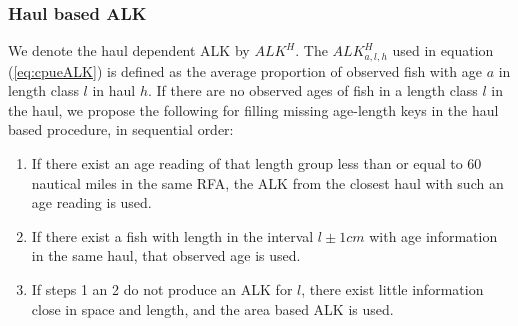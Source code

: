 \documentclass[a4paper 12pt]{article}
\numberwithin{equation}{section}
\newcommand{\ed}[1]{\textcolor{red}{#1}}
\newcommand{\olav}[1]{\textcolor{darkgreen}{#1}}
\begin{document}
\subsubsection{Haul based ALK}
\label{sec:haulestimator}
We denote the haul dependent ALK  by  $ALK^{H}$. The $ALK^{H}_{a,l,h}$  used in equation (\ref{eq:cpueALK}) is defined as the average proportion of observed fish with age $a$ in  length class $l$ in haul $h$. If there are no observed ages of fish in a length class $l$ in the haul, we propose the following for filling missing age-length keys in the  haul based procedure, in sequential order:
\begin{enumerate}
\item If there exist an age reading of that length group less than or equal to 60 nautical miles in the same RFA, the ALK from the closest haul with such an age reading is used.
\item If there exist a fish with length in the interval $l\pm 1cm$ with age information in the same haul, that observed age is used.  
\item If steps 1 an 2 do not produce an ALK for $l$, there exist little information close in space and length, and the area based ALK is used. %
\end{enumerate}
\end{document}
